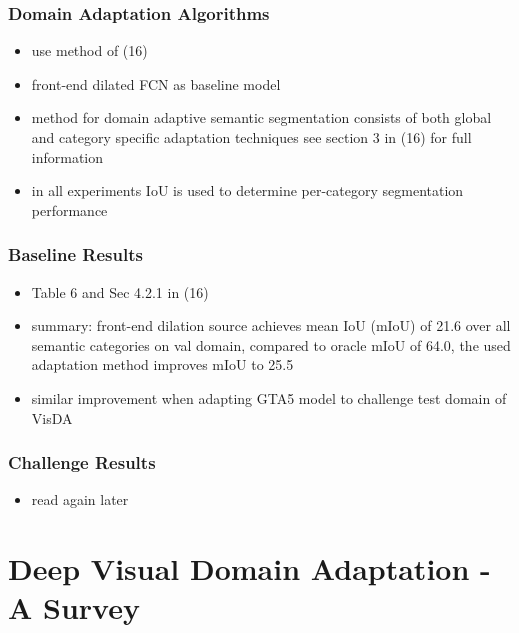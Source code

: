 \documentclass[]{article}
\begin{document}
\subsubsection{Domain Adaptation Algorithms}
\begin{itemize}
	\item use method of (16)
	\item front-end dilated FCN as baseline model
	\item method for domain adaptive semantic segmentation consists of both global and category specific adaptation techniques see section 3 in (16) for full information
	\item in all experiments IoU is used to determine per-category segmentation performance
\end{itemize}

\subsubsection{Baseline Results}
\begin{itemize}
	\item Table 6 and Sec 4.2.1 in (16)
	\item summary: front-end dilation source achieves mean IoU (mIoU) of 21.6 over all semantic categories on val domain, compared to oracle mIoU of 64.0, the used adaptation method improves mIoU to 25.5
	\item similar improvement when adapting GTA5 model to challenge test domain of VisDA
\end{itemize}

\subsubsection{Challenge Results}
\begin{itemize}
	\item read again later
\end{itemize}


\section{Deep Visual Domain Adaptation - A Survey}
\end{document}
